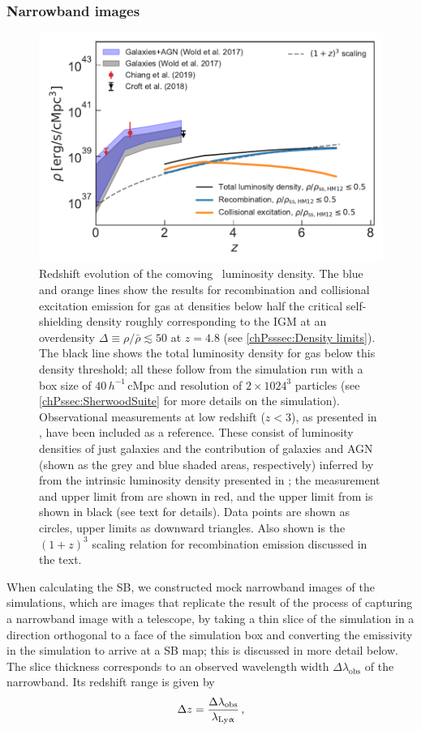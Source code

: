 \subsubsection{Narrowband images}
\label{chPsssec:Narrowband}
\begin{figure}[t]
    \centering
    \includegraphics[width=0.6\linewidth]{"Plots/ChapterP/Global_luminosity"}
    \caption[Redshift evolution of the \lya\ luminosity density]
    {Redshift evolution of the comoving \lya\ luminosity density. The blue and orange lines show the results for recombination and collisional excitation emission for gas at densities below half the critical self-shielding density roughly corresponding to the IGM at an overdensity $\Delta \equiv \rho/\bar{\rho} \lesssim 50$ at $z=4.8$ (see \cref{chPsssec:Density limits}). The black line shows the total luminosity density for gas below this density threshold; all these follow from the simulation run with a box size of $40 \, h^{-1} \, \mathrm{cMpc}$ and resolution of $2 \times 1024^3$ particles (see \cref{chPssec:SherwoodSuite} for more details on the simulation). Observational measurements at low redshift ($z<3$), as presented in \citet{2019ApJ...877..150C}, have been included as a reference. These consist of luminosity densities of just galaxies and the contribution of galaxies and AGN (shown as the grey and blue shaded areas, respectively) inferred by \citet{2019ApJ...877..150C} from the intrinsic luminosity density presented in \citet{2017ApJ...848..108W}; the measurement and upper limit from \citet{2019ApJ...877..150C} are shown in red, and the upper limit from \citet{2018MNRAS.481.1320C} \citep[converted to a luminosity density by][]{2019ApJ...877..150C} is shown in black (see text for details). Data points are shown as circles, upper limits as downward triangles. Also shown is the $(1+z)^3$ scaling relation for recombination emission discussed in the text.}
    \label{chPfig:z_evolution_lum}
\end{figure}

When calculating the SB, we constructed mock narrowband images of the simulations, which are images that replicate the result of the process of capturing a narrowband image with a telescope, by taking a thin slice of the simulation in a direction orthogonal to a face of the simulation box and converting the emissivity in the simulation to arrive at a SB map; this is discussed in more detail below. The slice thickness corresponds to an observed wavelength width $\Delta\lambda_\text{obs}$ of the narrowband. Its redshift range is given by
\begin{equation}
    \Delta z = \frac{\Delta \lambda_\text{obs}}{\lambda_\text{{Ly\ensuremath{\upalpha}}}} \, ,
\end{equation}

